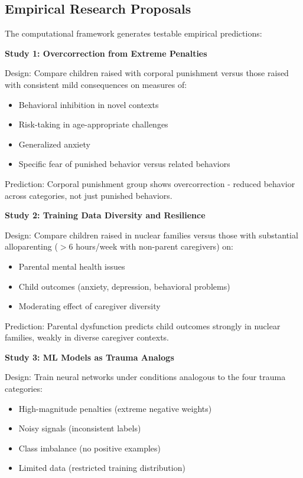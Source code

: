 \documentclass{article}
\begin{document}
\subsection{Empirical Research Proposals}

The computational framework generates testable empirical predictions:

\textbf{Study 1: Overcorrection from Extreme Penalties}

Design: Compare children raised with corporal punishment versus those raised with consistent mild consequences on measures of:
\begin{itemize}
\item Behavioral inhibition in novel contexts
\item Risk-taking in age-appropriate challenges
\item Generalized anxiety
\item Specific fear of punished behavior versus related behaviors
\end{itemize}

Prediction: Corporal punishment group shows overcorrection - reduced behavior across categories, not just punished behaviors.

\textbf{Study 2: Training Data Diversity and Resilience}

Design: Compare children raised in nuclear families versus those with substantial alloparenting ($>$6 hours/week with non-parent caregivers) on:
\begin{itemize}
\item Parental mental health issues
\item Child outcomes (anxiety, depression, behavioral problems)
\item Moderating effect of caregiver diversity
\end{itemize}

Prediction: Parental dysfunction predicts child outcomes strongly in nuclear families, weakly in diverse caregiver contexts.

\textbf{Study 3: ML Models as Trauma Analogs}

Design: Train neural networks under conditions analogous to the four trauma categories:
\begin{itemize}
\item High-magnitude penalties (extreme negative weights)
\item Noisy signals (inconsistent labels)
\item Class imbalance (no positive examples)
\item Limited data (restricted training distribution)
\end{itemize}
\end{document}
